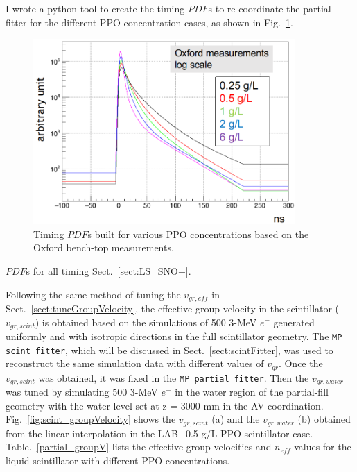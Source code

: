 I wrote a python tool to create the timing $PDF$s to re-coordinate the partial fitter for the different PPO concentration cases\cite{partialFitterPDF}, as shown in Fig.~\ref{fig:oxfordPdf}.
\begin{figure}[!htb]
	\centering
	\includegraphics[width=10cm]{oxfordPdf_log.png}
	\caption{Timing $PDF$s built for various PPO concentrations based on the Oxford bench-top measurements.}
	\label{fig:oxfordPdf}
\end{figure}


$PDF$s for all timing Sect.~\ref{sect:LS_SNO+}.

Following the same method of tuning the $v_{gr,eff}$ in Sect.~\ref{sect:tuneGroupVelocity}, the effective group velocity in the scintillator ($v_{gr,scint}$) is obtained based on the simulations of 500 3-MeV $e^-$ generated uniformly and with isotropic directions in the full scintillator geometry. The \texttt{MP scint fitter}, which will be discussed in Sect.~\ref{sect:scintFitter}, was used to reconstruct the same simulation data with different values of $v_{gr}$. Once the $v_{gr,scint}$ was obtained, it was fixed in the \texttt{MP partial fitter}. Then the $v_{gr,water}$ was tuned by simulating 500 3-MeV $e^-$ in the water region of the partial-fill geometry with the water level set at z = 3000 mm in the AV coordination. Fig.~\ref{fig:scint_groupVelocity} shows the $v_{gr,scint}$ (a) and the $v_{gr,water}$ (b) obtained from the linear interpolation in the LAB+0.5 g/L PPO scintillator case. Table.~\ref{partial_groupV} lists the effective group velocities and $n_{eff}$ values for the liquid scintillator with different PPO concentrations. 
		
